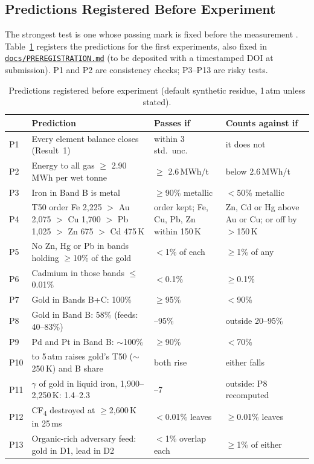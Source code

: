\documentclass[11pt,a4paper]{article}
\newcommand{\gh}[2]{\href{https://github.com/syncaissa/paramanu-reclaimer/blob/main/#1}{\texttt{#2}}}
\theoremstyle{definition}
\theoremstyle{plain}
\theoremstyle{remark}
\begin{document}
\subsection{Predictions Registered Before Experiment}\label{sec:prereg}
The strongest test is one whose passing mark is fixed before the measurement \citep{nosek2018}. Table~\ref{tab:prereg} registers the predictions for the first experiments, also fixed in \gh{docs/PREREGISTRATION.md}{docs/PREREGISTRATION.md} (to be deposited with a timestamped DOI at submission). P1 and P2 are consistency checks; P3--P13 are risky tests.

\begin{table}[!htbp]
\centering
\caption{Predictions registered before experiment (default synthetic residue, 1\,atm unless stated).}\label{tab:prereg}
\footnotesize
\begin{tabular}{@{}l>{\raggedright\arraybackslash}p{5.6cm}>{\raggedright\arraybackslash}p{3.0cm}>{\raggedright\arraybackslash}p{4.0cm}@{}}
\toprule
& \textbf{Prediction} & \textbf{Passes if} & \textbf{Counts against if} \\
\midrule
P1 & Every element balance closes (Result~1) & within 3 std.\ unc. & it does not \\
P2 & Energy to all gas $\geq$ 2.90\,MWh per wet tonne & $\geq$ 2.6\,MWh/t & below 2.6\,MWh/t \\
P3 & Iron in Band B is metal & $\geq$90\% metallic & $<$50\% metallic \\
P4 & T50 order Fe 2,225 $>$ Au 2,075 $>$ Cu 1,700 $>$ Pb 1,025 $>$ Zn 675 $>$ Cd 475\,K & order kept; Fe, Cu, Pb, Zn within 150\,K & Zn, Cd or Hg above Au or Cu; or off by $>$150\,K \\
P5 & No Zn, Hg or Pb in bands holding $\geq$10\% of the gold & $<$1\% of each & $\geq$1\% of any \\
P6 & Cadmium in those bands $\leq$0.01\% & $<$0.1\% & $\geq$0.1\% \\
P7 & Gold in Bands B+C: 100\% & $\geq$95\% & $<$90\% \\
P8 & Gold in Band B: 58\% (feeds: 40--83\%) & 20--95\% & outside 20--95\% \\
P9 & Pd and Pt in Band B: $\sim$100\% & $\geq$90\% & $<$70\% \\
P10 & 1 to 5\,atm raises gold's T50 ($\sim$250\,K) and B share & both rise & either falls \\
P11 & $\gamma$ of gold in liquid iron, 1,900--2,250\,K: 1.4--2.3 & 0.5--7 & outside: P8 recomputed \\
P12 & CF\textsubscript{4} destroyed at $\geq$2,600\,K in 25\,ms & $<$0.01\% leaves & $\geq$0.01\% leaves \\
P13 & Organic-rich adversary feed: gold in D1, lead in D2 & $<$1\% overlap each & $\geq$1\% of either \\
\bottomrule
\end{tabular}
\end{table}
\end{document}
